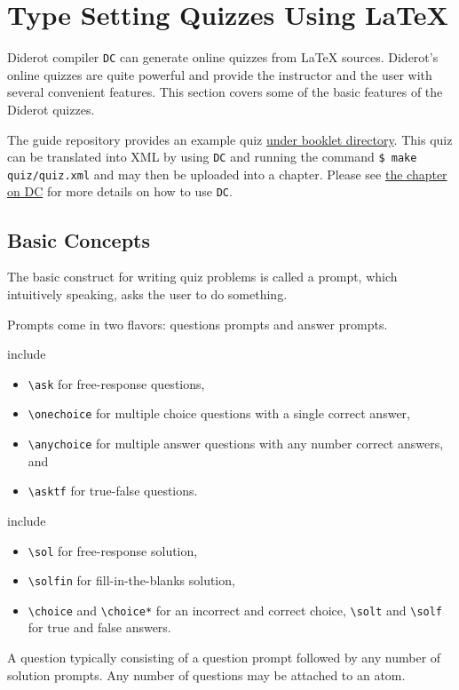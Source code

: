 \section{Type Setting Quizzes Using LaTeX}
\label{ch:quiz::typesetting}

Diderot compiler \lstinline`DC` can generate online quizzes from LaTeX sources. Diderot’s online quizzes are quite powerful and provide the instructor and the user with several convenient features. This section covers some of the basic features of the Diderot quizzes.  

The guide repository provides an example quiz 
\href{https://github.com/diderot-edu/diderot-guide/tree/master/booklet}{under booklet directory}. 
%
This quiz can be translated into XML by using \lstinline`DC` and running the command 
%
\lstinline`$ make quiz/quiz.xml`
%
and may then be uploaded into a chapter. 
%
Please see \href{ch:dc}{the chapter on DC} for more details on how to use \lstinline`DC`.

\subsection{Basic Concepts}
The basic construct for writing quiz problems is called a  prompt, which intuitively speaking, asks the user to do something.


\begin{gram}[Prompts]
Prompts come in two flavors: questions prompts and answer prompts.
%

  include 
%
\begin{itemize}
\item \lstinline`\ask` for free-response questions, 
%
\item \lstinline`\onechoice` for multiple choice questions with a single correct answer, 
%
\item \lstinline`\anychoice` for multiple answer questions with any number correct answers, and 
%
\item \lstinline`\asktf` for true-false questions.
\end{itemize}

  include 
%
\begin{itemize}

\item \lstinline`\sol` for free-response solution, 
%
\item \lstinline`\solfin` for fill-in-the-blanks solution, 
%
\item \lstinline`\choice` and \lstinline`\choice*` for an incorrect and correct choice, 
%
\lstinline`\solt` and \lstinline`\solf`   for true and false answers.
\end{itemize}

A question typically consisting of a question prompt followed by any
number of solution prompts.  
%
Any number of questions may be attached  to an atom.
\end{gram}


